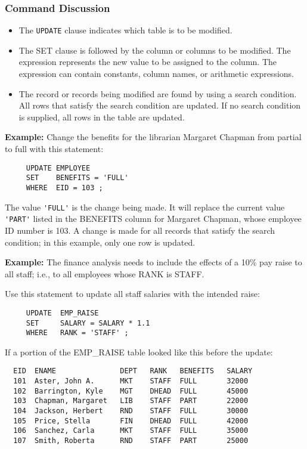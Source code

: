 \subsubsection{Command Discussion}

\begin{itemize}
\item The \verb`UPDATE` clause indicates which table is to be modified.

\item The SET clause is followed by the column or columns to be
modified.  The expression represents the new value to be assigned to
the column.  The expression can contain constants,
column names,
or arithmetic expressions.

\item The record or records being modified are found by using a search
condition.  All rows that satisfy the search condition are updated.
If no search condition is supplied, all rows in the table are updated.
\end{itemize}

{\bf Example:}
Change the benefits for the librarian Margaret Chapman from partial to
full with this statement:
\begin{verbatim}
     UPDATE EMPLOYEE
     SET    BENEFITS = 'FULL'
     WHERE  EID = 103 ;
\end{verbatim}

The value \verb`'FULL'` is the change being made.  It will replace the
current value \verb`'PART'` listed in the BENEFITS column for Margaret
Chapman, whose employee ID number is 103.  A change is made for all
records that satisfy the search condition; in this example, only one
row is updated.

{\bf Example:}
The finance analysis needs to include the effects of a 10\% pay raise
to all staff; i.e., to all employees whose RANK is STAFF.

Use this statement to update all staff salaries with the intended
raise:
\begin{verbatim}
     UPDATE  EMP_RAISE
     SET     SALARY = SALARY * 1.1
     WHERE   RANK = 'STAFF' ;
\end{verbatim}

If a portion of the EMP\_RAISE table looked like this before the
update:

\begin{screen}
\begin{verbatim}
  EID  ENAME               DEPT   RANK   BENEFITS   SALARY
  101  Aster, John A.      MKT    STAFF  FULL       32000
  102  Barrington, Kyle    MGT    DHEAD  FULL       45000
  103  Chapman, Margaret   LIB    STAFF  PART       22000
  104  Jackson, Herbert    RND    STAFF  FULL       30000
  105  Price, Stella       FIN    DHEAD  FULL       42000
  106  Sanchez, Carla      MKT    STAFF  FULL       35000
  107  Smith, Roberta      RND    STAFF  PART       25000
\end{verbatim}
\end{screen}

